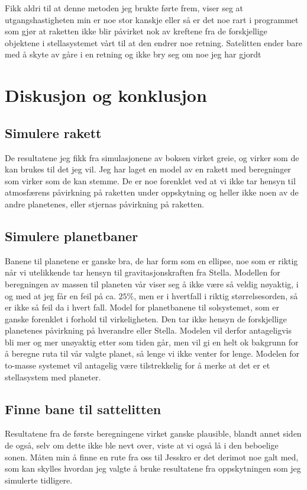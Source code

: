 \documentclass[11pt, A4paper, norsk]{report}
\begin{document}
Fikk aldri til at denne metoden jeg brukte førte frem, viser seg at utgangshastigheten min er noe stor kanskje eller så er det noe rart i programmet som gjør at raketten ikke blir påvirket nok av kreftene fra de forskjellige objektene i stellasystemet vårt til at den endrer noe retning.
Satelitten ender bare med å skyte av gåre i en retning og ikke bry seg om noe jeg har gjordt


	\section{Diskusjon og konklusjon}
		\subsection{Simulere rakett}
De resultatene jeg fikk fra simulasjonene av boksen virket greie, og virker som de kan brukes til det jeg vil.
Jeg har laget en model av en rakett med beregninger som virker som de kan stemme. De er noe forenklet ved at vi ikke tar hensyn til atmosfærens påvirkning på raketten under oppskytning og heller ikke noen av de andre planetenes, eller stjernas påvirkning på raketten.

		\subsection{Simulere planetbaner}
Banene til planetene er ganske bra, de har form som en ellipse, noe som er riktig når vi utelikkende tar hensyn til gravitasjonskraften fra Stella. Modellen for beregningen av massen til planeten vår viser seg å ikke være så veldig nøyaktig, i og med at jeg får en feil på ca. $25 \%$, men er i hvertfall i riktig størrelsesorden, så er ikke så feil da i hvert fall.
Model for planetbanene til solsystemet, som er ganske forenklet i forhold til virkeligheten. Den tar ikke hensyn de forskjellige planetenes påvirkning på hverandre eller Stella. Modelen vil derfor antageligvis bli mer og mer unøyaktig etter som tiden går, men vil gi en helt ok bakgrunn for å beregne ruta til vår valgte planet, så lenge vi ikke venter for lenge. Modelen for to-masse systemet vil antagelig være tilstrekkelig for å merke at det er et stellasystem med planeter.

		\subsection{Finne bane til sattelitten}
Resultatene fra de første beregningene virket ganske plausible, blandt annet siden de også, selv om dette ikke ble nevt over, viste at vi også lå i den beboelige sonen.
Måten min å finne en rute fra oss til Jesskro er det derimot noe galt med, som kan skylles hvordan jeg valgte å bruke resultatene fra oppskytningen som jeg simulerte tidligere.
\end{document}
